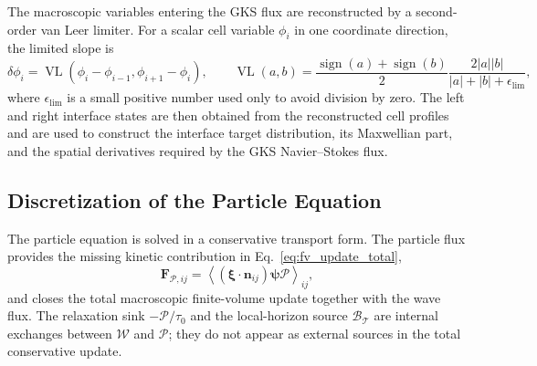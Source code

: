 \documentclass[preprint,12pt]{elsarticle}
\begin{document}
The macroscopic variables entering the GKS flux are reconstructed by a second-order van Leer limiter. For a scalar cell variable $\phi_i$ in one coordinate direction, the limited slope is
\begin{equation}\label{eq:vanleer_limiter}
    \delta\phi_i
    =
    \operatorname{VL}(\phi_i-\phi_{i-1},\phi_{i+1}-\phi_i),
    \qquad
    \operatorname{VL}(a,b)
    =
    \frac{\operatorname{sign}(a)+\operatorname{sign}(b)}{2}
    \frac{2|a||b|}{|a|+|b|+\epsilon_{\mathrm{lim}}},
\end{equation}
where $\epsilon_{\mathrm{lim}}$ is a small positive number used only to avoid division by zero. The left and right interface states are then obtained from the reconstructed cell profiles and are used to construct the interface target distribution, its Maxwellian part, and the spatial derivatives required by the GKS Navier--Stokes flux.

\subsection{Discretization of the Particle Equation}\label{sec:algorithm_particle}

The particle equation is solved in a conservative transport form. The particle flux provides the missing kinetic contribution in Eq.~\eqref{eq:fv_update_total},
\begin{equation}\label{eq:particle_flux_closure}
    \mathbf F_{\mathcal{P},ij}
    =
    \left\langle (\boldsymbol{\xi}\cdot\boldsymbol{n}_{ij})\boldsymbol{\psi}\mathcal{P} \right\rangle_{ij},
\end{equation}
and closes the total macroscopic finite-volume update together with the wave flux. The relaxation sink $-\mathcal{P}/\tau_0$ and the local-horizon source $\mathcal B_\mathcal{T}$ are internal exchanges between $\mathcal{W}$ and $\mathcal{P}$; they do not appear as external sources in the total conservative update.
\end{document}
